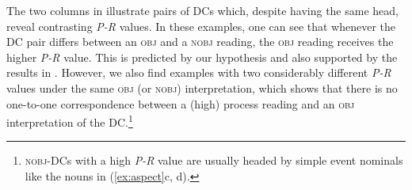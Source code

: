 \documentclass[output=paper]{langsci/langscibook}
\begin{document}
The two columns in  illustrate pairs of DCs which, despite having the same head, reveal contrasting \textit{P-R} values. In these examples, one can see that whenever the DC pair differs  {between an \textsc{obj} and a} \textsc{nobj} reading, the \textsc{obj} reading receives the higher \textit{P-R} value. This is predicted by our hypothesis and also supported by the results in .
However, we also find examples with two  {considerably} different \textit{P-R} values under the same \textsc{obj} (or \textsc{nobj}) interpretation, which shows that there is no one-to-one correspondence between a (high) process reading and an \textsc{obj} interpretation of the DC.\footnote{\textsc{nobj}-DCs with a high \textit{P-R} value are usually headed by simple event nominals like the nouns in (\ref{ex:aspect}c, d).} 
\end{document}
